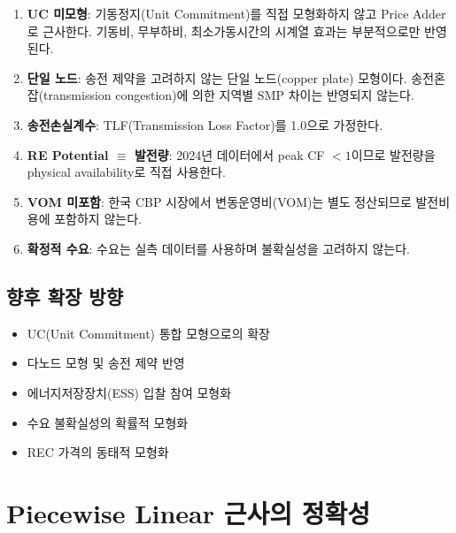 \documentclass[11pt, a4paper]{article}
\begin{document}
\begin{enumerate}[noitemsep]
    \item \textbf{UC 미모형}: 기동정지(Unit Commitment)를 직접 모형화하지 않고
          Price Adder로 근사한다. 기동비, 무부하비, 최소가동시간의 시계열 효과는
          부분적으로만 반영된다.

    \item \textbf{단일 노드}: 송전 제약을 고려하지 않는 단일 노드(copper plate) 모형이다.
          송전혼잡(transmission congestion)에 의한 지역별 SMP 차이는 반영되지 않는다.

    \item \textbf{송전손실계수}: TLF(Transmission Loss Factor)를 1.0으로 가정한다.

    \item \textbf{RE Potential $\equiv$ 발전량}: 2024년 데이터에서 peak CF $< 1$이므로
          발전량을 physical availability로 직접 사용한다.

    \item \textbf{VOM 미포함}: 한국 CBP 시장에서 변동운영비(VOM)는 별도 정산되므로
          발전비용에 포함하지 않는다.

    \item \textbf{확정적 수요}: 수요는 실측 데이터를 사용하며 불확실성을 고려하지 않는다.
\end{enumerate}

\subsection{향후 확장 방향}

\begin{itemize}[noitemsep]
    \item UC(Unit Commitment) 통합 모형으로의 확장
    \item 다노드 모형 및 송전 제약 반영
    \item 에너지저장장치(ESS) 입찰 참여 모형화
    \item 수요 불확실성의 확률적 모형화
    \item REC 가격의 동태적 모형화
\end{itemize}


\appendix

\section{Piecewise Linear 근사의 정확성}\label{app:piecewise}
\end{document}
